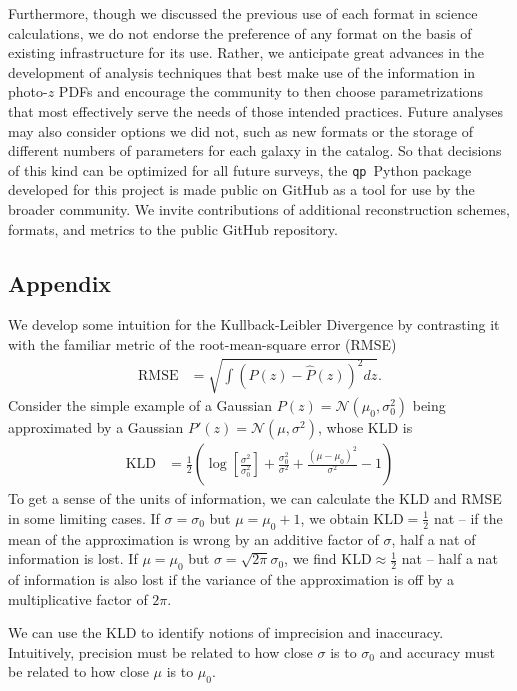 \documentclass[\docopts]{\docclass}
\newcommand{\qp}{\texttt{qp}}
\newcommand{\pz}{photo-$z$ PDF}
\begin{document}
Furthermore, though we discussed the previous use of each format in science 
calculations, we do not endorse the preference of any format on the basis of 
existing infrastructure for its use.
Rather, we anticipate great advances in the development of analysis techniques 
that best make use of the information in \pz s and encourage the community to 
then choose parametrizations that most effectively serve the needs of those 
intended practices.
Future analyses may also consider options we did not, such as new formats or 
the storage of different numbers of parameters for each galaxy in the catalog.
So that decisions of this kind can be optimized for all future surveys, the 
\qp\ Python package developed for this project is made public on GitHub as a 
tool for use by the broader community.
We invite contributions of additional reconstruction schemes, formats, and 
metrics to the public GitHub repository.


\subsection*{Appendix}
\label{sec:kld}

We develop some intuition for the Kullback-Leibler Divergence by contrasting it 
with the familiar metric of the root-mean-square error (RMSE)
\begin{align}
  \label{eq:rmse}
  \mathrm{RMSE} &= \sqrt{\int (P(z) - \hat{P}(z))^{2} dz}.
\end{align}
Consider the simple example of a Gaussian $P(z)=\mathcal{N}(\mu_{0}, 
\sigma_{0}^{2})$ being approximated by a Gaussian $P'(z)=\mathcal{N}(\mu, 
\sigma^{2})$, whose KLD is
\begin{align}
  \label{eq:gaussian}
  \mathrm{KLD} &= 
\frac{1}{2}\left(\log\left[\frac{\sigma^{2}}{\sigma_{0}^{2}}\right] + 
\frac{\sigma_{0}^{2}}{\sigma^{2}} + \frac{(\mu-\mu_{0})^{2}}{\sigma^{2}} - 
1\right)
\end{align}
To get a sense of the units of information, we can calculate the KLD and RMSE 
in some limiting cases.
If $\sigma=\sigma_{0}$ but $\mu=\mu_{0}+1$, we obtain 
$\mathrm{KLD}=\frac{1}{2}$ nat -- if the mean of the approximation is wrong by 
an additive factor of $\sigma$, half a nat of information is lost.
If $\mu=\mu_{0}$ but $\sigma=\sqrt{2\pi}\sigma_{0}$, we find 
$\mathrm{KLD}\approx\frac{1}{2}$ nat -- half a nat of information is also lost 
if the variance of the approximation is off by a multiplicative factor of 
$2\pi$.

We can use the KLD to identify notions of imprecision and inaccuracy.
Intuitively, precision must be related to how close $\sigma$ is to $\sigma_{0}$ 
and accuracy must be related to how close $\mu$ is to $\mu_{0}$.
\end{document}
